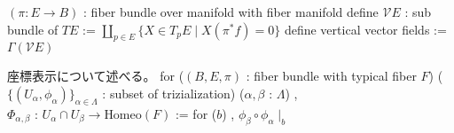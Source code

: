 \begin{Definition}
\itemwhen \((\pi : E \to B)\) : fiber bundle over manifold with fiber manifold
\itemdefi
  define \(\mathcal{V}E\) : sub bundle of \(TE\) := \(\coprod_{p \in E} \{X \in T_p E \mid X(\pi^* f) = 0\}\)
  define vertical vector fields := \(\Gamma(\mathcal{V}E)\)
\end{Definition}

\begin{Definition}
\itemnote
  座標表示について述べる。
\itemdefi
  for (\((B , E , \pi)\) : fiber bundle with typical fiber \(F\)) (\(\{(U_\alpha , \phi_\alpha)\}_{\alpha \in \Lambda}\) : subset of trizialization) (\(\alpha , \beta\) : \(\Lambda\)) ,\\
  \(\Phi_{\alpha , \beta}\) : \(U_\alpha \cap U_\beta \to \text{Homeo}(F)\) := for (\(b\)) , \(\phi_\beta \circ \phi_\alpha \mid_b\)
\end{Definition}